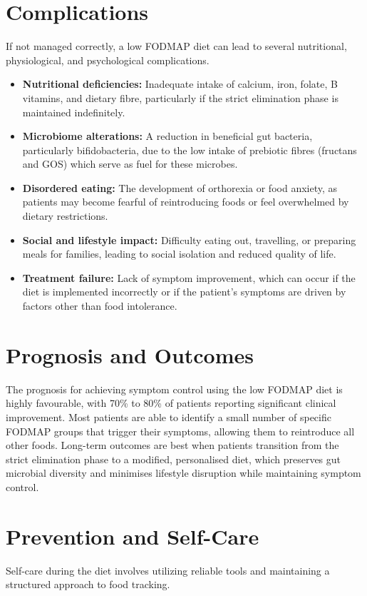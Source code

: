\section*{Complications}
If not managed correctly, a low FODMAP diet can lead to several nutritional, physiological, and psychological complications.

\begin{itemize}
    \item \textbf{Nutritional deficiencies:} Inadequate intake of calcium, iron, folate, B vitamins, and dietary fibre, particularly if the strict elimination phase is maintained indefinitely.
    \item \textbf{Microbiome alterations:} A reduction in beneficial gut bacteria, particularly bifidobacteria, due to the low intake of prebiotic fibres (fructans and GOS) which serve as fuel for these microbes.
    \item \textbf{Disordered eating:} The development of orthorexia or food anxiety, as patients may become fearful of reintroducing foods or feel overwhelmed by dietary restrictions.
    \item \textbf{Social and lifestyle impact:} Difficulty eating out, travelling, or preparing meals for families, leading to social isolation and reduced quality of life.
    \item \textbf{Treatment failure:} Lack of symptom improvement, which can occur if the diet is implemented incorrectly or if the patient's symptoms are driven by factors other than food intolerance.
\end{itemize}

\section*{Prognosis and Outcomes}
The prognosis for achieving symptom control using the low FODMAP diet is highly favourable, with 70\% to 80\% of patients reporting significant clinical improvement. Most patients are able to identify a small number of specific FODMAP groups that trigger their symptoms, allowing them to reintroduce all other foods. Long-term outcomes are best when patients transition from the strict elimination phase to a modified, personalised diet, which preserves gut microbial diversity and minimises lifestyle disruption while maintaining symptom control.

\section*{Prevention and Self-Care}
Self-care during the diet involves utilizing reliable tools and maintaining a structured approach to food tracking.


